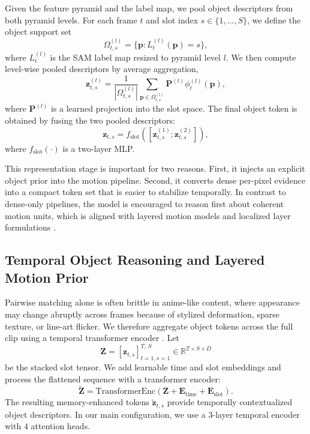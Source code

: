 Given the feature pyramid and the label map, we pool object descriptors from both pyramid levels. For each frame $t$ and slot index $s\in\{1,\dots,S\}$, we define the object support set
\begin{equation}
\Omega_{t,s}^{(l)} = \{\mathbf{p} : L_t^{(l)}(\mathbf{p}) = s\},
\end{equation}
where $L_t^{(l)}$ is the SAM label map resized to pyramid level $l$. We then compute level-wise pooled descriptors by average aggregation,
\begin{equation}
\mathbf{z}_{t,s}^{(l)} = \frac{1}{|\Omega_{t,s}^{(l)}|} \sum_{\mathbf{p} \in \Omega_{t,s}^{(l)}} \mathbf{P}^{(l)}\phi_t^{(l)}(\mathbf{p}),
\end{equation}
where $\mathbf{P}^{(l)}$ is a learned projection into the slot space. The final object token is obtained by fusing the two pooled descriptors:
\begin{equation}
\mathbf{z}_{t,s} = f_{\mathrm{slot}}\left([\mathbf{z}_{t,s}^{(1)} ; \mathbf{z}_{t,s}^{(2)}]\right),
\end{equation}
where $f_{\mathrm{slot}}(\cdot)$ is a two-layer MLP.

This representation stage is important for two reasons. First, it injects an explicit object prior into the motion pipeline. Second, it converts dense per-pixel evidence into a compact token set that is easier to stabilize temporally. In contrast to dense-only pipelines, the model is encouraged to reason first about coherent motion units, which is aligned with layered motion models and localized layer formulations \cite{wang1994representing,sevillalara2016optical}.

\subsection{Temporal Object Reasoning and Layered Motion Prior}

Pairwise matching alone is often brittle in anime-like content, where appearance may change abruptly across frames because of stylized deformation, sparse texture, or line-art flicker. We therefore aggregate object tokens across the full clip using a temporal transformer encoder \cite{vaswani2017attention}. Let
\begin{equation}
\mathbf{Z} = [\mathbf{z}_{t,s}]_{t=1,s=1}^{T,\,S} \in \mathbb{R}^{T\times S\times D}
\end{equation}
be the stacked slot tensor. We add learnable time and slot embeddings and process the flattened sequence with a transformer encoder:
\begin{equation}
\widetilde{\mathbf{Z}} = \mathrm{TransformerEnc}(\mathbf{Z} + \mathbf{E}_{\mathrm{time}} + \mathbf{E}_{\mathrm{slot}}).
\end{equation}
The resulting memory-enhanced tokens $\tilde{\mathbf{z}}_{t,s}$ provide temporally contextualized object descriptors. In our main configuration, we use a $3$-layer temporal encoder with $4$ attention heads.

